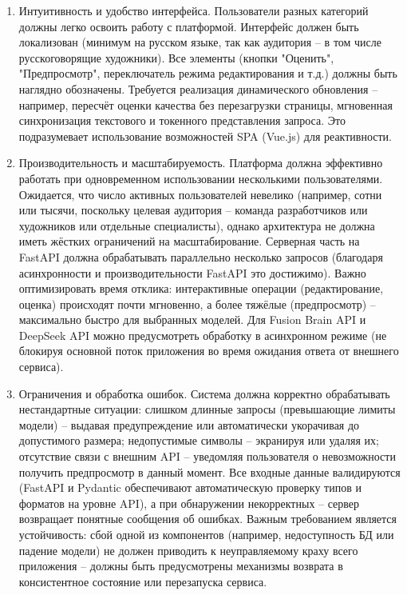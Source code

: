 \begin{enumerate}[label=\arabic*]
    \item Интуитивность и удобство интерфейса. Пользователи разных категорий должны легко освоить работу с платформой. Интерфейс должен быть локализован (минимум на русском языке, так как аудитория – в том числе русскоговорящие художники). Все элементы (кнопки "Оценить", "Предпросмотр", переключатель режима редактирования и т.д.) должны быть наглядно обозначены. Требуется реализация динамического обновления – например, пересчёт оценки качества без перезагрузки страницы, мгновенная синхронизация текстового и токенного представления запроса. Это подразумевает использование возможностей SPA (Vue.js) для реактивности.
    \item  Производительность и масштабируемость. Платформа должна эффективно работать при одновременном использовании несколькими пользователями. Ожидается, что число активных пользователей невелико (например, сотни или тысячи, поскольку целевая аудитория – команда разработчиков или художников или отдельные специалисты), однако архитектура не должна иметь жёстких ограничений на масштабирование. Серверная часть на FastAPI должна обрабатывать параллельно несколько запросов (благодаря асинхронности и производительности FastAPI это достижимо)\cite{fastapi:practicum}. Важно оптимизировать время отклика: интерактивные операции (редактирование, оценка) происходят почти мгновенно, а более тяжёлые (предпросмотр) – максимально быстро для выбранных моделей.  Для Fusion Brain API и DeepSeek API можно предусмотреть обработку в асинхронном режиме (не блокируя основной поток приложения во время ожидания ответа от внешнего сервиса).
    \item Ограничения и обработка ошибок. Система должна корректно обрабатывать нестандартные ситуации: слишком длинные запросы (превышающие лимиты модели) – выдавая предупреждение или автоматически укорачивая до допустимого размера; недопустимые символы – экранируя или удаляя их; отсутствие связи с внешним API – уведомляя пользователя о невозможности получить предпросмотр в данный момент. Все входные данные валидируются (FastAPI и Pydantic обеспечивают автоматическую проверку типов и форматов на уровне API\cite{yandex:fastapi}), а при обнаружении некорректных – сервер возвращает понятные сообщения об ошибках. Важным требованием является устойчивость: сбой одной из компонентов (например, недоступность БД или падение модели) не должен приводить к неуправляемому краху всего приложения – должны быть предусмотрены механизмы возврата в консистентное состояние или перезапуска сервиса.

\end{enumerate}

